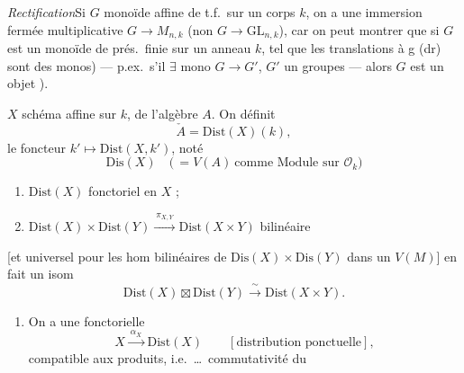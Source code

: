 \documentclass[11pt,a4paper]{article}
\begin{document}
\emph{Rectification}\quad Si $G$ monoïde affine de t.f.\ sur un corps $k$, on a une immersion fermée multiplicative $G \to M_{n,k}$ (non $G \to \mathrm{GL}_{n,k}$), car on peut montrer que si $G$ est un monoïde de prés.\ finie sur un anneau $k$, tel que les translations à g (dr) sont des monos) --- p.ex.\ s'il $\exists$ mono $G \to G'$, $G'$ un  groupes --- alors $G$ est un objet ).

 $X$ schéma affine sur $k$, \ill{} de l'algèbre $A$. On définit
\[
  \check{A} = \mathrm{Dist}(X)(k) ,
\]
\ill{} \ill{} le foncteur $k' \mapsto \mathrm{Dist}(X, k')$, noté
\[
  \mathrm{Dis}(X) \quad \bigl(\,= V(A)\ \text{comme Module sur } \mathcal{O}_k\bigr)
\]
\begin{enumerate}
  \item[a)] $\mathrm{Dist}(X)$ fonctoriel  en $X$ ;
  \item[b)] $\mathrm{Dist}(X) \times \mathrm{Dist}(Y) \xrightarrow{\ \pi_{X,Y}\ } \mathrm{Dist}(X \times Y)$ bilinéaire
\end{enumerate}
[et universel pour les hom bilinéaires de $\mathrm{Dis}(X) \times \mathrm{Dis}(Y)$ dans un $V(M)$]  en fait un isom
\[
  \mathrm{Dist}(X) \boxtimes \mathrm{Dist}(Y) \xrightarrow{\ \sim\ } \mathrm{Dist}(X \times Y) .
\]
\begin{enumerate}
  \item[c)] On a une  fonctorielle
  \[
    X \xrightarrow{\ \alpha_X\ } \mathrm{Dist}(X) \qquad [\text{distribution ponctuelle}],
  \]
  compatible aux produits, i.e.\ …\ commutativité du
\end{enumerate}


\end{document}
